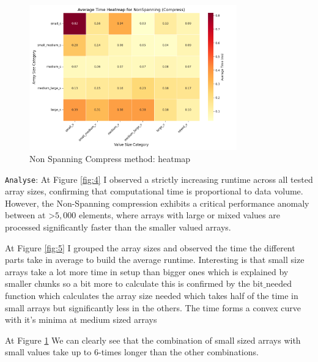 \documentclass[11pt, a4paper]{article}
\begin{document}
	\begin{figure}[H]%
		\centering
		\includegraphics[width=0.8\textwidth]{Grafics/NonSpanning/NonSpanningCompressHeat.png}
		\caption{Non Spanning Compress method: heatmap}
		\label{fig:6}
	\end{figure}
	\texttt{Analyse}: At Figure \ref{fig:4} I observed a strictly increasing runtime across all tested array sizes, confirming that computational time is proportional to data volume. However, the Non-Spanning compression exhibits a critical performance anomaly between at >$5,000$ elements, where arrays with large or mixed values are processed significantly faster than the smaller valued arrays. 
		\par %
	
	At Figure \ref{fig:5} I grouped the array sizes and observed the time the different parts take in average to build the average runtime. Interesting is that small size arrays take a lot more time in setup than bigger ones which is explained by smaller chunks so a bit more to calculate this is confirmed by the $\text{bit\_needed}$ function which calculates the array size needed which takes half of the time in small arrays but significantly less in the others. The time forms a convex curve with it's minima at medium sized arrays 
	
	At Figure \ref{fig:6} We can clearly see that the combination of small sized arrays with small values take up to 6-times longer than the other combinations.
	
\end{document}
